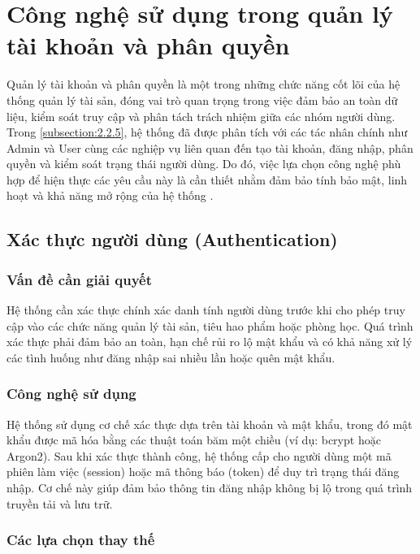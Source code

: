 \documentclass[../DoAn.tex]{subfiles}
\begin{document}
\section{Công nghệ sử dụng trong quản lý tài khoản và phân quyền}
\label{section:3.x}

Quản lý tài khoản và phân quyền là một trong những chức năng cốt lõi của hệ thống quản lý tài sản, đóng vai trò quan trọng trong việc đảm bảo an toàn dữ liệu, kiểm soát truy cập và phân tách trách nhiệm giữa các nhóm người dùng. Trong \autoref{subsection:2.2.5}, hệ thống đã được phân tích với các tác nhân chính như Admin và User cùng các nghiệp vụ liên quan đến tạo tài khoản, đăng nhập, phân quyền và kiểm soát trạng thái người dùng. Do đó, việc lựa chọn công nghệ phù hợp để hiện thực các yêu cầu này là cần thiết nhằm đảm bảo tính bảo mật, linh hoạt và khả năng mở rộng của hệ thống \cite{owasp2023top10}.

\subsection{Xác thực người dùng (Authentication)}

\subsubsection{Vấn đề cần giải quyết}

Hệ thống cần xác thực chính xác danh tính người dùng trước khi cho phép truy cập vào các chức năng quản lý tài sản, tiêu hao phẩm hoặc phòng học. Quá trình xác thực phải đảm bảo an toàn, hạn chế rủi ro lộ mật khẩu và có khả năng xử lý các tình huống như đăng nhập sai nhiều lần hoặc quên mật khẩu.

\subsubsection{Công nghệ sử dụng}

Hệ thống sử dụng cơ chế xác thực dựa trên tài khoản và mật khẩu, trong đó mật khẩu được mã hóa bằng các thuật toán băm một chiều (ví dụ: bcrypt hoặc Argon2). Sau khi xác thực thành công, hệ thống cấp cho người dùng một mã phiên làm việc (session) hoặc mã thông báo (token) để duy trì trạng thái đăng nhập. Cơ chế này giúp đảm bảo thông tin đăng nhập không bị lộ trong quá trình truyền tải và lưu trữ.

\subsubsection{Các lựa chọn thay thế}
\end{document}
